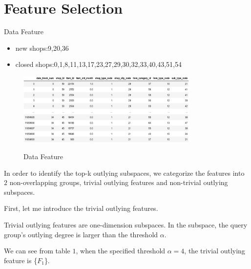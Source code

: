 \documentclass[
 size=12pt,
 paper=smartboard,  %
 mode=present, 		%
 display=slides, 	%
 style=tuliplab,  	%
 pauseslide,
 fleqn,leqno]{powerdot}
\begin{document}
\section{Feature Selection}
\begin{slide}{Data Feature}
  \begin{itemize}
    \item
    \smallskip
    new shops:9,20,36 
    \item
    closed shops:0,1,8,11,13,17,23,27,29,30,32,33,40,43,51,54
  \end{itemize}
  \vspace{0.75cm}
  \begin{figure}[htbp]
    \centering
    \includegraphics[width=0.8\textwidth,height=0.4\textwidth]{figures/Figure7.eps}\\
    \caption{Data Feature}
  \end{figure}
    
    \begin{note}
    In order to identify the top-k outlying subspaces,
    we categorize the features into $2$ non-overlapping groups,
    trivial outlying features and non-trivial outlying subspaces.
    
    First, let me introduce the trivial outlying features.
    
    Trivial outlying features are one-dimension subspaces.
    In the subspace,
    the query group's outlying degree is larger than the threshold $\alpha$.
    
    We can see from table $1$,
    when the specified threshold $\alpha = 4$,
    the trivial outlying feature is \{$F_1$\}.
    \end{note}
    
    \end{slide}
\end{document}
